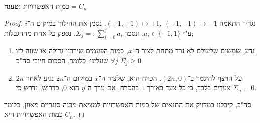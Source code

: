 \documentclass[]{article}
\begin{document}
	\textbf{טענה: } $ \text{כמות האפשרויות} = C_n $
	
	\begin{proof}
		נגדיר התאמה $(+1, +1) \mapsto +1, \ (+1, -1) \mapsto -1$. נסמן את ההילוך במיקום ה־$i$ ע"י $a_i \in \{-1, 1\}$, ונסמן $\Sigma_j =: \sum_{i = 0}^{j}a_i$. נספק כל אחת מההגבלות;
		\begin{enumerate}
			\item נדע, שמשום שלעולם לא נרד מתחת לציר ה־$x$, כמות הפעמים שירדנו גדולה או שווה לזו שעלינו: כלומר, הסכום חיובי סה"כ $\forall j. \Sigma_j \ge 0$
			\item על הרצף להיגמר ב־$(2n, 0)$. הכרח הוא, שלציר ה־$x$ במיקום ה־$2n$ נגיע לאחר $2n$ צעדים בלבד, כי כל צעד באורך $1$ בהכרח. אם ערך ה־$y$ הוא $0$, כדרוש, נדרש כי $\Sigma_n = 0$.
		\end{enumerate}
		סה"כ, קיבלנו במדויק את התנאים של כמות האפשרויות למציאת מבנה סוגריים מאוזן, כלומר כמות האפשרויות היא $C_n$. 
	\end{proof}
	
\end{document}
